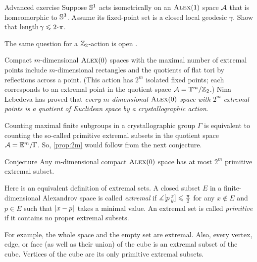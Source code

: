 \begin{thm}{Advanced exercise}\label{ex:S1actsS3}
Suppose $\mathbb{S}^1$ acts isometrically on an $\textsc{Alex}(1)$ space $\mathcal{A}$ that is homeomorphic to $\mathbb{S}^3$.
Assume its fixed-point set is a closed local geodesic $\gamma$.
Show that $\length\gamma\le2\cdot\pi$.
\end{thm}

The same question for a $\mathbb{Z}_2$-action is open \cite{petrunin-involution}.

Compact $m$-dimensional $\textsc{Alex}(0)$ spaces with the maximal number of extremal points include $m$-dimensional rectangles and the quotients of flat tori by reflections across a point.
(This action has $2^m$ isolated fixed points; each corresponds to an extremal point in the quotient space $\mathcal{A}=\mathbb{T}^m/\mathbb{Z}_2$.)
Nina Lebedeva has proved \cite{lebedeva2015} that \textit{every $m$-dimensional $\textsc{Alex}(0)$ space with $2^m$ extremal points is a quotient of Euclidean space by a crystallographic action}.

Counting maximal finite subgroups in a crystallographic group $\Gamma$ is equivalent to counting the so-called primitive extremal subsets in the quotient space $\mathcal{A}=\mathbb{E}^m/\Gamma$.
So, \ref{prop:2m} would follow from the next conjecture.

\begin{thm}{Conjecture}
Any $m$-dimensional compact $\textsc{Alex}(0)$ space has at most $2^m$ primitive extremal subset.
\end{thm}

Here is an equivalent definition of extremal sets.  
A closed subset $E$ in a finite-dimensional Alexandrov space is called 
\emph{extremal} if $\measuredangle[p\,{}^{x}_{y}]\leqslant \tfrac\pi2$ for any $x\notin E$ and $p\in E$ such that $|{x}-{p}|_{}^{{}}$ takes a minimal value.
An extremal set is called \emph{primitive} if it contains no proper extremal subsets.

For example, the whole space and the empty set are extremal.
Also, every vertex, edge, or face (as well as their union) of the cube is an extremal subset of the cube.
Vertices of the cube are its only primitive extremal subsets.

